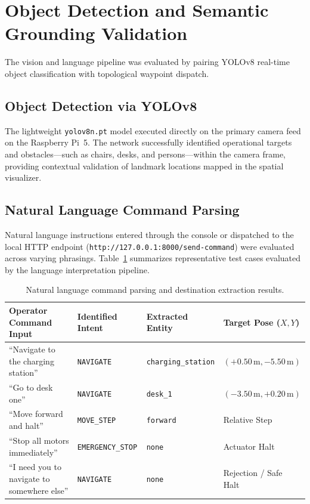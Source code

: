 \section{Object Detection and Semantic Grounding Validation}
The vision and language pipeline was evaluated by pairing YOLOv8 real-time object classification with topological waypoint dispatch.

\subsection{Object Detection via YOLOv8}
The lightweight \texttt{yolov8n.pt} model executed directly on the primary camera feed on the Raspberry Pi~5. The network successfully identified operational targets and obstacles—such as chairs, desks, and persons—within the camera frame, providing contextual validation of landmark locations mapped in the spatial visualizer.

\subsection{Natural Language Command Parsing}
Natural language instructions entered through the console or dispatched to the local HTTP endpoint (\texttt{http://127.0.0.1:8000/send-command}) were evaluated across varying phrasings. Table~\ref{tab:nlp_performance} summarizes representative test cases evaluated by the language interpretation pipeline.

\begin{table}[htbp]
\centering
\small
\caption{Natural language command parsing and destination extraction results.}
\label{tab:nlp_performance}
\renewcommand{\arraystretch}{1.3}
\begin{tabularx}{\textwidth}{>{\raggedright\arraybackslash}X >{\raggedright\arraybackslash}p{2.6cm} >{\raggedright\arraybackslash}p{2.8cm} >{\raggedright\arraybackslash}p{2.6cm}}
\hline
\textbf{Operator Command Input} & \textbf{Identified Intent} & \textbf{Extracted Entity} & \textbf{Target Pose ($X, Y$)} \\ \hline
``Navigate to the charging station'' & \texttt{NAVIGATE} & \texttt{charging\_station} & $(+0.50\,\text{m}, -5.50\,\text{m})$ \\ \hline
``Go to desk one'' & \texttt{NAVIGATE} & \texttt{desk\_1} & $(-3.50\,\text{m}, +0.20\,\text{m})$ \\ \hline
``Move forward and halt'' & \texttt{MOVE\_STEP} & \texttt{forward} & Relative Step \\ \hline
``Stop all motors immediately'' & \texttt{EMERGENCY\_STOP} & \texttt{none} & Actuator Halt \\ \hline
``I need you to navigate to somewhere else'' & \texttt{NAVIGATE} & \texttt{none} & Rejection / Safe Halt \\ \hline
\end{tabularx}
\end{table}


